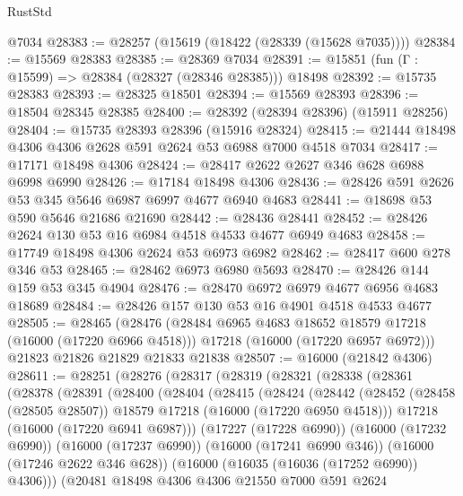 \begin{lexlean}{RustStd}
\begin{coremodule}
    @7034
@28383 := @28257 (@15619 (@18422 (@28339 (@15628 @7035))))
@28384 := @15569 @28383
@28385 := @28369 @7034
@28391 := @15851 (fun (Γ : @15599) => @28384 (@28327 (@28346 @28385))) @18498
@28392 := @15735 @28383
@28393 := @28325 @18501
@28394 := @15569 @28393
@28396 := @18504 @28345 @28385
@28400 := @28392 (@28394 @28396) (@15911 @28256)
@28404 := @15735 @28393 @28396 (@15916 @28324)
@28415 := @21444 @18498 @4306 @4306 @2628 @591 @2624 @53 @6988 @7000 @4518 @7034
@28417 := @17171 @18498 @4306
@28424 := @28417 @2622 @2627 @346 @628 @6988 @6998 @6990
@28426 := @17184 @18498 @4306
@28436 := @28426 @591 @2626 @53 @345 @5646 @6987 @6997 @4677 @6940 @4683
@28441 := @18698 @53 @590 @5646 @21686 @21690
@28442 := @28436 @28441
@28452 := @28426 @2624 @130 @53 @16 @6984 @4518 @4533 @4677 @6949 @4683
@28458 := @17749 @18498 @4306 @2624 @53 @6973 @6982
@28462 := @28417 @600 @278 @346 @53
@28465 := @28462 @6973 @6980 @5693
@28470 := @28426 @144 @159 @53 @345 @4904
@28476 := @28470 @6972 @6979 @4677 @6956 @4683 @18689
@28484 := @28426 @157 @130 @53 @16 @4901 @4518 @4533 @4677
@28505 := @28465
    (@28476
      (@28484 @6965 @4683 @18652 @18579 @17218 (@16000 (@17220 @6966 @4518)))
      @17218
      (@16000 (@17220 @6957 @6972)))
    @21823
    @21826
    @21829
    @21833
    @21838
@28507 := @16000 (@21842 @4306)
@28611 := @28251
    (@28276
      (@28317
        (@28319
          (@28321
            (@28338
              (@28361
                (@28378
                  (@28391
                    (@28400
                      (@28404
                        (@28415
                          (@28424
                            (@28442
                              (@28452
                                (@28458 (@28505 @28507))
                                @18579
                                @17218
                                (@16000 (@17220 @6950 @4518)))
                              @17218
                              (@16000 (@17220 @6941 @6987)))
                            (@17227 (@17228 @6990))
                            (@16000 (@17232 @6990))
                            (@16000 (@17237 @6990))
                            (@16000 (@17241 @6990 @346))
                            (@16000 (@17246 @2622 @346 @628))
                            (@16000 (@16035 (@16036 (@17252 @6990)) @4306)))
                          (@20481
                            @18498
                            @4306
                            @4306
                            @21550
                            @7000
                            @591
                            @2624

\end{coremodule}
\end{lexlean}
